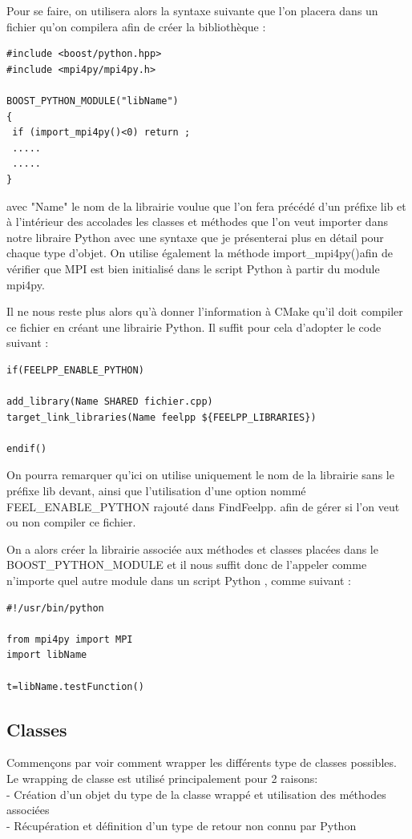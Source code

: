 \documentclass[french,12pt]{article}
\begin{document}
Pour se faire, on utilisera alors la syntaxe suivante que l'on placera dans un fichier qu'on compilera afin de créer la bibliothèque :

\begin{lstlisting}
#include <boost/python.hpp>
#include <mpi4py/mpi4py.h>

BOOST_PYTHON_MODULE("libName")
{
 if (import_mpi4py()<0) return ;
 .....
 .....
}

\end{lstlisting}

avec "Name" le nom de la librairie voulue que l'on fera précédé d'un préfixe lib et à l'intérieur des accolades les classes et méthodes que l'on veut importer dans notre libraire Python avec une syntaxe que je présenterai plus en détail pour chaque type d'objet. On utilise également la méthode import\_mpi4py()afin de vérifier que MPI est bien initialisé dans le script Python à partir du module mpi4py.
\newline

Il ne nous reste plus alors qu'à donner l'information à CMake qu'il doit compiler ce fichier en créant une librairie Python. Il suffit pour cela d'adopter le code suivant :

\newpage
\begin{lstlisting}
if(FEELPP_ENABLE_PYTHON)

add_library(Name SHARED fichier.cpp)
target_link_libraries(Name feelpp ${FEELPP_LIBRARIES})

endif()
\end{lstlisting}

On pourra remarquer qu'ici on utilise uniquement le nom de la librairie sans le préfixe lib devant, ainsi que l'utilisation d'une option nommé FEEL\_ENABLE\_PYTHON rajouté dans FindFeelpp. afin de gérer si l'on veut ou non compiler ce fichier. 
\newline

On a alors créer la librairie associée aux méthodes et classes placées dans le BOOST\_PYTHON\_MODULE et il nous suffit donc de l'appeler comme n'importe quel autre module dans un script Python , comme suivant :

\begin{lstlisting}
#!/usr/bin/python

from mpi4py import MPI
import libName

t=libName.testFunction()
\end{lstlisting}

\subsection{Classes}
Commençons par voir comment wrapper les différents type de classes possibles.
Le wrapping de classe est utilisé principalement pour 2 raisons:\\
- Création d'un objet du type de la classe wrappé et utilisation des méthodes associées \\
- Récupération et définition d'un type de retour non connu par Python\\
\end{document}
